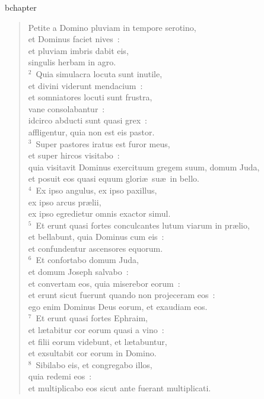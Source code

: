 bchapter\begin{verse}\vspace{-19pt}Petite a Domino pluviam in tempore serotino,\\ et Dominus faciet nives~:\\ et pluviam imbris dabit eis,\\ singulis herbam in agro.\\
${}^{2}$~Quia simulacra locuta sunt inutile,\\ et divini viderunt mendacium~:\\ et somniatores locuti sunt frustra,\\ vane consolabantur~:\\ idcirco abducti sunt quasi grex~:\\ affligentur, quia non est eis pastor.\\
${}^{3}$~Super pastores iratus est furor meus,\\ et super hircos visitabo~:\\ quia visitavit Dominus exercituum gregem suum, domum Juda,\\ et posuit eos quasi equum glori\ae\ su\ae\ in bello.\\
${}^{4}$~Ex ipso angulus, ex ipso paxillus,\\ ex ipso arcus pr\ae lii,\\ ex ipso egredietur omnis exactor simul.\\
${}^{5}$~Et erunt quasi fortes conculcantes lutum viarum in pr\ae lio,\\ et bellabunt, quia Dominus cum eis~:\\ et confundentur ascensores equorum.\\
${}^{6}$~Et confortabo domum Juda,\\ et domum Joseph salvabo~:\\ et convertam eos, quia miserebor eorum~:\\ et erunt sicut fuerunt quando non projeceram eos~:\\ ego enim Dominus Deus eorum, et exaudiam eos.\\
${}^{7}$~Et erunt quasi fortes Ephraim,\\ et l\ae tabitur cor eorum quasi a vino~:\\ et filii eorum videbunt, et l\ae tabuntur,\\ et exsultabit cor eorum in Domino.\\
${}^{8}$~Sibilabo eis, et congregabo illos,\\ quia redemi eos~:\\ et multiplicabo eos sicut ante fuerant multiplicati.\\

\end{verse}
